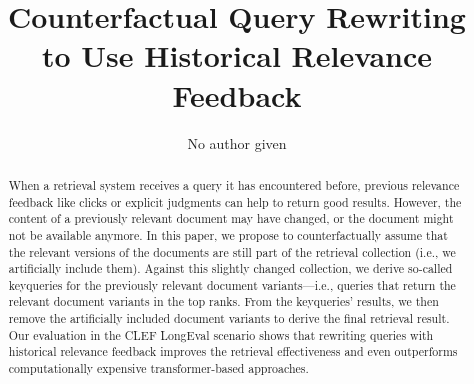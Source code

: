 \title{Counterfactual Query Rewriting \\ to Use Historical Relevance Feedback}

\author{No author given}



\maketitle

\begin{abstract}
When a retrieval system receives a query it has encountered before, previous relevance feedback like clicks or explicit judgments can help to return good results. However, the content of a previously relevant document may have changed, or the document might not be available anymore. In this paper, we propose to counterfactually assume that the relevant versions of the documents are still part of the retrieval collection (i.e., we artificially include them). Against this slightly changed collection, we derive so-called keyqueries for the previously relevant document variants---i.e., queries that return the relevant document variants in the top ranks. From the keyqueries' results, we then remove the artificially included document variants to derive the final retrieval result. Our evaluation in the CLEF LongEval scenario shows that rewriting queries with historical relevance feedback improves the retrieval effectiveness and even outperforms computationally expensive transformer-based approaches.

\end{abstract}
